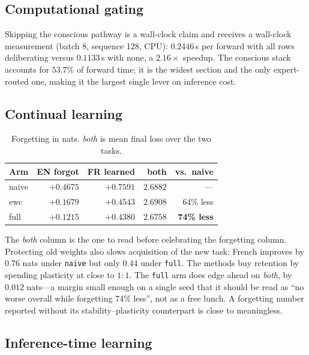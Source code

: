 \documentclass[10pt,twocolumn]{article}
\begin{document}
\subsection{Computational gating}

Skipping the conscious pathway is a wall-clock claim and receives a wall-clock
measurement (batch 8, sequence 128, CPU): $0.2446$\,s per forward with all rows
deliberating versus $0.1133$\,s with none, a $2.16\times$ speedup. The conscious
stack accounts for $53.7\%$ of forward time; it is the widest section and the
only expert-routed one, making it the largest single lever on inference cost.

\subsection{Continual learning}
\label{sec:continual}

\begin{table}[h]
\centering\small
\begin{tabular}{@{}lrrrr@{}}
\toprule
Arm & EN forgot & FR learned & both & vs.\ naive \\
\midrule
naive & $+0.4675$ & $+0.7591$ & $2.6882$ & --- \\
ewc   & $+0.1679$ & $+0.4543$ & $2.6908$ & 64\% less \\
full  & $\mathbf{+0.1215}$ & $+0.4380$ & $\mathbf{2.6758}$ & \textbf{74\% less} \\
\bottomrule
\end{tabular}
\caption{Forgetting in nats. \emph{both} is mean final loss over the two tasks.}
\label{tab:continual}
\end{table}

The \emph{both} column is the one to read before celebrating the forgetting
column. Protecting old weights also slows acquisition of the new task: French
improves by $0.76$ nats under \texttt{naive} but only $0.44$ under
\texttt{full}. The methods buy retention by spending plasticity at close to
$1{:}1$. The \texttt{full} arm does edge ahead on \emph{both}, by $0.012$
nats---a margin small enough on a single seed that it should be read as ``no
worse overall while forgetting 74\% less'', not as a free lunch. A forgetting
number reported without its stability--plasticity counterpart is close to
meaningless.

\subsection{Inference-time learning}
\end{document}

